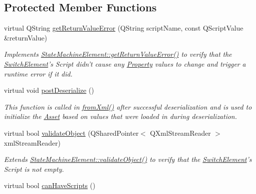\subsection*{Protected Member Functions}
\begin{DoxyCompactItemize}
\item 
virtual Q\-String \hyperlink{class_picto_1_1_switch_element_a5e85db73b4d74a5c5301579d9212ca83}{get\-Return\-Value\-Error} (Q\-String script\-Name, const Q\-Script\-Value \&return\-Value)
\begin{DoxyCompactList}\small\item\em Implements \hyperlink{class_picto_1_1_scriptable_container_a1e0264aee7ce551d450dc07a6b369d56}{State\-Machine\-Element\-::get\-Return\-Value\-Error()} to verify that the \hyperlink{class_picto_1_1_switch_element}{Switch\-Element}'s Script didn't cause any \hyperlink{class_picto_1_1_property}{Property} values to change and trigger a runtime error if it did. \end{DoxyCompactList}\item 
virtual void \hyperlink{class_picto_1_1_switch_element_a7b8c8d832b705b234f18badcf1ec31bb}{post\-Deserialize} ()
\begin{DoxyCompactList}\small\item\em This function is called in \hyperlink{class_picto_1_1_asset_a8bed4da09ecb1c07ce0dab313a9aba67}{from\-Xml()} after successful deserialization and is used to initialize the \hyperlink{class_picto_1_1_asset}{Asset} based on values that were loaded in during deserialization. \end{DoxyCompactList}\item 
\hypertarget{class_picto_1_1_switch_element_ac45d51381bd2aec3dfa5aa6847ccb817}{virtual bool \hyperlink{class_picto_1_1_switch_element_ac45d51381bd2aec3dfa5aa6847ccb817}{validate\-Object} (Q\-Shared\-Pointer$<$ Q\-Xml\-Stream\-Reader $>$ xml\-Stream\-Reader)}\label{class_picto_1_1_switch_element_ac45d51381bd2aec3dfa5aa6847ccb817}

\begin{DoxyCompactList}\small\item\em Extends \hyperlink{class_picto_1_1_state_machine_element_a52a176b16cf803ed3e7f82f3e1a4dfb7}{State\-Machine\-Element\-::validate\-Object()} to verify that the \hyperlink{class_picto_1_1_switch_element}{Switch\-Element}'s Script is not empty. \end{DoxyCompactList}\item 
\hypertarget{class_picto_1_1_switch_element_a8eeadd3533c946a5063492a1fe9c9b85}{virtual bool \hyperlink{class_picto_1_1_switch_element_a8eeadd3533c946a5063492a1fe9c9b85}{can\-Have\-Scripts} ()}\label{class_picto_1_1_switch_element_a8eeadd3533c946a5063492a1fe9c9b85}


\end{DoxyCompactItemize}
